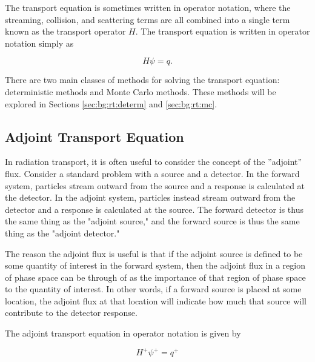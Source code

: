 
The transport equation is sometimes written in operator notation, where the streaming, collision, and scattering terms are all combined into a single term known as the transport operator $H$.
The transport equation is written in operator notation simply as

\begin{equation}\label{eq:bg:rt:transport-operator}
  H\psi = q.
\end{equation}

There are two main classes of methods for solving the transport equation: deterministic methods and Monte Carlo methods.
These methods will be explored in Sections \ref{sec:bg:rt:determ} and \ref{sec:bg:rt:mc}.

\subsection{Adjoint Transport Equation}
\label{sec:bg:rt:adjoint}

In radiation transport, it is often useful to consider the concept of the ''adjoint'' flux.
Consider a standard problem with a source and a detector.
In the forward system, particles stream outward from the source and a response is calculated at the detector.
In the adjoint system, particles instead stream outward from the detector and a response is calculated at the source.
The forward detector is thus the same thing as the "adjoint source," and the forward source is thus the same thing as the "adjoint detector."

The reason the adjoint flux is useful is that if the adjoint source is defined to be some quantity of interest in the forward system, then the adjoint flux in a region of phase space can be through of as the importance of that region of phase space to the quantity of interest.
In other words, if a forward source is placed at some location, the adjoint flux at that location will indicate how much that source will contribute to the detector response.

The adjoint transport equation in operator notation is given by

\begin{equation}\label{eq:bg:rt:adjoint-transport-operator}
  H^+\psi^+ = q^+
\end{equation}

